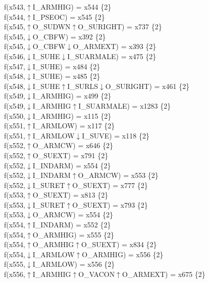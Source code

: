 f(x543,$\uparrow$I\_ARMHIG) = x544 \{2\} \\  
f(x544,$\uparrow$I\_PSEOC) = x545 \{2\} \\  
f(x545,$\uparrow$O\_SUDWN$\uparrow$O\_SURIGHT) = x737 \{2\} \\  
f(x545,$\downarrow$O\_CBFW) = x392 \{2\} \\  
f(x545,$\downarrow$O\_CBFW$\downarrow$O\_ARMEXT) = x393 \{2\} \\  
f(x546,$\downarrow$I\_SUHE$\downarrow$I\_SUARMALE) = x475 \{2\} \\  
f(x547,$\downarrow$I\_SUHE) = x484 \{2\} \\  
f(x548,$\downarrow$I\_SUHE) = x485 \{2\} \\  
f(x548,$\downarrow$I\_SUHE$\uparrow$I\_SURLS$\downarrow$O\_SURIGHT) = x461 \{2\} \\  
f(x549,$\downarrow$I\_ARMHIG) = x499 \{2\} \\  
f(x549,$\downarrow$I\_ARMHIG$\uparrow$I\_SUARMALE) = x1283 \{2\} \\  
f(x550,$\downarrow$I\_ARMHIG) = x115 \{2\} \\  
f(x551,$\uparrow$I\_ARMLOW) = x117 \{2\} \\  
f(x551,$\uparrow$I\_ARMLOW$\downarrow$I\_SUVE) = x118 \{2\} \\  
f(x552,$\uparrow$O\_ARMCW) = x646 \{2\} \\  
f(x552,$\uparrow$O\_SUEXT) = x791 \{2\} \\  
f(x552,$\downarrow$I\_INDARM) = x554 \{2\} \\  
f(x552,$\downarrow$I\_INDARM$\uparrow$O\_ARMCW) = x553 \{2\} \\  
f(x552,$\downarrow$I\_SURET$\uparrow$O\_SUEXT) = x777 \{2\} \\  
f(x553,$\uparrow$O\_SUEXT) = x813 \{2\} \\  
f(x553,$\downarrow$I\_SURET$\uparrow$O\_SUEXT) = x793 \{2\} \\  
f(x553,$\downarrow$O\_ARMCW) = x554 \{2\} \\  
f(x554,$\uparrow$I\_INDARM) = x552 \{2\} \\  
f(x554,$\uparrow$O\_ARMHIG) = x555 \{2\} \\  
f(x554,$\uparrow$O\_ARMHIG$\uparrow$O\_SUEXT) = x834 \{2\} \\  
f(x554,$\downarrow$I\_ARMLOW$\uparrow$O\_ARMHIG) = x556 \{2\} \\  
f(x555,$\downarrow$I\_ARMLOW) = x556 \{2\} \\  
f(x556,$\uparrow$I\_ARMHIG$\uparrow$O\_VACON$\uparrow$O\_ARMEXT) = x675 \{2\} \\  
